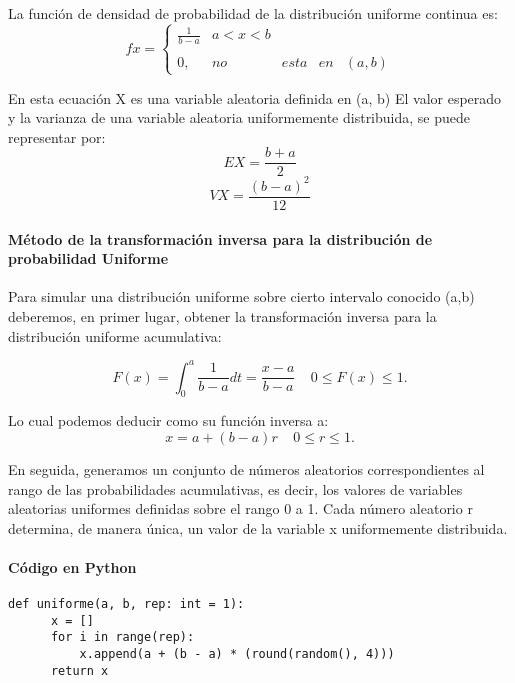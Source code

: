 \documentclass{article}
\begin{document}
  La función de densidad de probabilidad de la distribución uniforme continua es:
  \begin{equation}
    f{x} = \left\{\begin{array}{lcc}
                  \frac{1}{b-a} &   a<x<b \\
                  \\0, &no&esta&en&(a, b)
                  \end{array}
    \right.
  \end{equation}

  En esta ecuación  X es una variable aleatoria definida en (a, b)
  El valor esperado y la varianza de una variable aleatoria uniformemente distribuida, se puede representar por:
  \begin{equation}
    EX = \frac{b+a}{2}
  \end{equation}
  \begin{equation}
    VX = \frac{(b-a)^2}{12}
  \end{equation}

      \paragraph{Método de la transformación inversa para la distribución de probabilidad Uniforme}
  Para simular una distribución uniforme sobre cierto intervalo conocido (a,b) deberemos, en primer lugar, obtener la
  transformación inversa para la distribución uniforme acumulativa:

  \begin{equation}
    F(x) = \int_{0}^{a}\frac{1}{b-a}dt = \frac{x-a}{b-a} \ \text{  } \ 0 \leq F(x) \leq 1.
  \end{equation}

  Lo cual podemos deducir como su función inversa a:
  \begin{equation}
  x = a +(b-a)r \ \text{  }\ 0 \leq r \leq 1.
  \end{equation}

  En seguida, generamos un conjunto de números aleatorios correspondientes al rango de las probabilidades acumulativas,
  es decir, los valores de variables aleatorias uniformes definidas sobre el rango 0 a 1. Cada número aleatorio r determina,
  de manera única, un valor de la variable x uniformemente distribuida.

  \paragraph{Código en Python}
  \begin{lstlisting}[style = Python]
    def uniforme(a, b, rep: int = 1):
      x = []
      for i in range(rep):
          x.append(a + (b - a) * (round(random(), 4)))
      return x

  \end{lstlisting}
\end{document}

